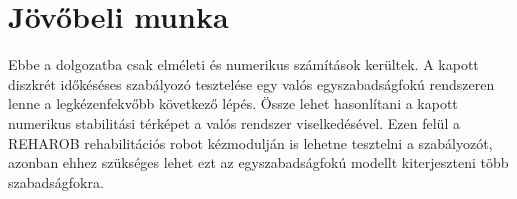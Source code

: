 \chapter{Jövőbeli munka}\label{chap:conclusion}

Ebbe a dolgozatba csak elméleti és numerikus számítások kerültek. A kapott 
diszkrét időkéséses szabályozó tesztelése egy valós egyszabadságfokú rendszeren 
lenne a legkézenfekvőbb következő lépés. Össze lehet hasonlítani a kapott 
numerikus stabilitási térképet a valós rendszer viselkedésével. Ezen felül 
a REHAROB rehabilitációs robot kézmodulján is lehetne tesztelni a szabályozót, azonban 
ehhez szükséges lehet ezt az egyszabadságfokú modellt kiterjeszteni több szabadságfokra.
